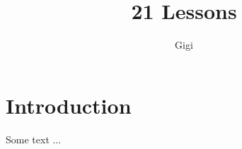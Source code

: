 \documentclass[a4paper,twoside]{scrbook}
\begin{document}
\title{21 Lessons}
\author{Gigi}
\frontmatter
\maketitle
\tableofcontents
\mainmatter
\chapter{Introduction}
Some text ...
\end{document}
